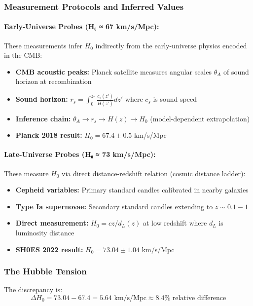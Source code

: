 \subsubsection{Measurement Protocols and Inferred Values}

\paragraph{Early-Universe Probes (H₀ ≈ 67 km/s/Mpc):}
These measurements infer $H_0$ indirectly from the early-universe physics encoded in the CMB:
\begin{itemize}
    \item \textbf{CMB acoustic peaks:} Planck satellite measures angular scales $\theta_A$ of sound horizon at recombination
    \item \textbf{Sound horizon:} $r_s = \int_0^{z_*} \frac{c_s(z')}{H(z')} dz'$ where $c_s$ is sound speed
    \item \textbf{Inference chain:} $\theta_A \to r_s \to H(z) \to H_0$ (model-dependent extrapolation)
    \item \textbf{Planck 2018 result:} $H_0 = 67.4 \pm 0.5$ km/s/Mpc
\end{itemize}

\paragraph{Late-Universe Probes (H₀ ≈ 73 km/s/Mpc):}
These measure $H_0$ via direct distance-redshift relation (cosmic distance ladder):
\begin{itemize}
    \item \textbf{Cepheid variables:} Primary standard candles calibrated in nearby galaxies
    \item \textbf{Type Ia supernovae:} Secondary standard candles extending to $z \sim 0.1-1$
    \item \textbf{Direct measurement:} $H_0 = cz/d_L(z)$ at low redshift where $d_L$ is luminosity distance
    \item \textbf{SH0ES 2022 result:} $H_0 = 73.04 \pm 1.04$ km/s/Mpc
\end{itemize}

\subsubsection{The Hubble Tension}

The discrepancy is:
\begin{equation}
\Delta H_0 = 73.04 - 67.4 = 5.64 \text{ km/s/Mpc} \approx 8.4\% \text{ relative difference}
\end{equation}

